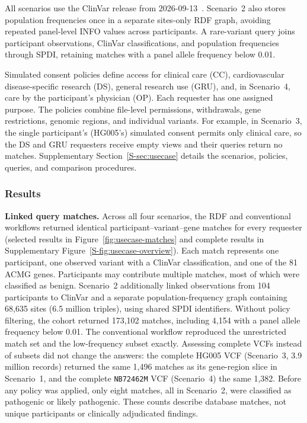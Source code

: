 \documentclass[pdflatex,sn-mathphys-num,referee]{sn-jnl}
\begin{document}
All scenarios use the ClinVar release from 2026-09-13~\cite{clinvar_vcf}.
Scenario~2 also stores population frequencies once in a separate sites-only RDF graph, avoiding repeated panel-level INFO values across participants.
A rare-variant query joins participant observations, ClinVar classifications, and population frequencies through SPDI, retaining matches with a panel allele frequency below 0.01.

Simulated consent policies define access for clinical care (CC), cardiovascular disease-specific research (DS), general research use (GRU), and, in Scenario~4, care by the participant's physician (OP).
Each requester has one assigned purpose.
The policies combine file-level permissions, withdrawals, gene restrictions, genomic regions, and individual variants.
For example, in Scenario~3, the single participant’s (HG005’s) simulated consent permits only clinical care, so the DS and GRU requesters receive empty views and their queries return no matches.
Supplementary Section~\ref{S-sec:usecase} details the scenarios, policies, queries, and comparison procedures.

\subsubsection{Results}
\textbf{Linked query matches.}
Across all four scenarios, the RDF and conventional workflows returned identical participant--variant--gene matches for every requester (selected results in Figure~\ref{fig:usecase-matches} and complete results in Supplementary Figure~\ref{S-fig:usecase-overview}).
Each match represents one participant, one observed variant with a ClinVar classification, and one of the 81 ACMG genes.
Participants may contribute multiple matches, most of which were classified as benign.
Scenario~2 additionally linked observations from 104 participants to ClinVar and a separate population-frequency graph containing 68,635 sites (6.5 million triples), using shared SPDI identifiers.
Without policy filtering, the cohort returned 173,102 matches, including 4,154 with a panel allele frequency below 0.01.
The conventional workflow reproduced the unrestricted match set and the low-frequency subset exactly.
Assessing complete VCFs instead of subsets did not change the answers: the complete HG005 VCF (Scenario~3, 3.9 million records) returned the same 1,496 matches as its gene-region slice in Scenario~1, and the complete \texttt{NB72462M} VCF (Scenario~4) the same 1,382.
Before any policy was applied, only eight matches, all in Scenario~2, were classified as pathogenic or likely pathogenic.
These counts describe database matches, not unique participants or clinically adjudicated findings.
\end{document}
